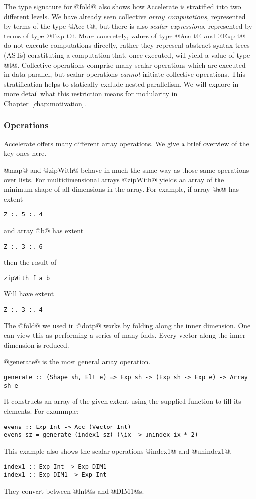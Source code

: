 The type signature for @fold@ also shows how Accelerate is stratified into two different levels. We have already seen collective \emph{array computations}, represented by terms of the type @Acc t@, but there is also \emph{scalar expressions}, represented by terms of type @Exp t@. More concretely, values of type @Acc t@ and @Exp t@ do not execute computations directly, rather they represent abstract syntax trees (ASTs) constituting a computation that, once executed, will yield a value of type @t@. Collective operations comprise many scalar operations which are executed in data-parallel, but scalar operations \emph{cannot} initiate collective operations. This stratification helps to statically exclude nested parallelism. We will explore in more detail what this restriction means for modularity in Chapter~\ref{chap:motivation}.

\subsubsection{Operations}

Accelerate offers many different array operations. We give a brief overview of the key ones here.

@map@ and @zipWith@ behave in much the same way as those same operations over lists. For multidimensional arrays @zipWith@ yields an array of the minimum shape of all dimensions in the array. For example, if array @a@ has extent
%
\begin{lstlisting}
Z :. 5 :. 4
\end{lstlisting}
%
and array @b@ has extent
%
\begin{lstlisting}
Z :. 3 :. 6
\end{lstlisting}
%
then the result of
%
\begin{lstlisting}
zipWith f a b
\end{lstlisting}
%
Will have extent
%
\begin{lstlisting}
Z :. 3 :. 4
\end{lstlisting}
%

The @fold@ we used in @dotp@ works by folding along the inner dimension. One can view this as performing a series of many folds. Every vector along the inner dimension is reduced.

@generate@ is the most general array operation.
%
\begin{lstlisting}
generate :: (Shape sh, Elt e) => Exp sh -> (Exp sh -> Exp e) -> Array sh e
\end{lstlisting}
%
It constructs an array of the given extent using the supplied function to fill its elements. For exammple:
%
\begin{lstlisting}
evens :: Exp Int -> Acc (Vector Int)
evens sz = generate (index1 sz) (\ix -> unindex ix * 2)
\end{lstlisting}
%
This example also shows the scalar operations @index1@ and @unindex1@.
%
\begin{lstlisting}
index1 :: Exp Int -> Exp DIM1
index1 :: Exp DIM1 -> Exp Int
\end{lstlisting}
%
They convert between @Int@s and @DIM1@s.

